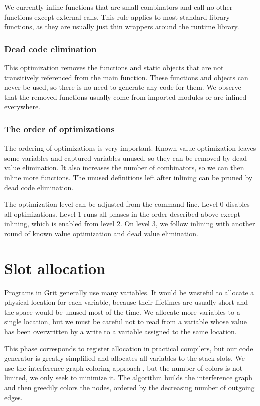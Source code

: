 We currently inline functions that are small combinators and call no other
functions except external calls. This rule applies to most standard library
functions, as they are usually just thin wrappers around the runtime library.

\subsubsection{Dead code elimination}

This optimization removes the functions and static objects that are not
transitively referenced from the main function. These functions and objects can
never be used, so there is no need to generate any code for them. We observe
that the removed functions usually come from imported modules or are inlined
everywhere.

\subsubsection{The order of optimizations}

The ordering of optimizations is very important. Known value optimization leaves
some variables and captured variables unused, so they can be removed by
dead value elimination. It also increases the number of combinators, so we can
then inline more functions. The unused definitions left after inlining can be
pruned by dead code elimination.

The optimization level can be adjusted from the command line. Level 0 disables
all optimizations. Level 1 runs all phases in the order described above except
inlining, which is enabled from level 2. On level 3, we follow inlining with
another round of known value optimization and dead value elimination.

\section{Slot allocation}

Programs in Grit generally use many variables. It would be wasteful to allocate
a physical location for each variable, because their lifetimes are usually short
and the space would be unused most of the time. We allocate more variables to a
single location, but we must be careful not to read from a variable whose value has
been overwritten by a write to a variable assigned to the same location.

This phase corresponds to register allocation in practical compilers, but our
code generator is greatly simplified and allocates all variables to the stack
slots. We use the interference graph coloring approach
\cite{chaitin1981register,chaitin1982register,briggs1994improvements}, but the
number of colors is not limited, we only seek to minimize it. The algorithm
builds the interference graph and then greedily colors the nodes, ordered by the
decreasing number of outgoing edges.

